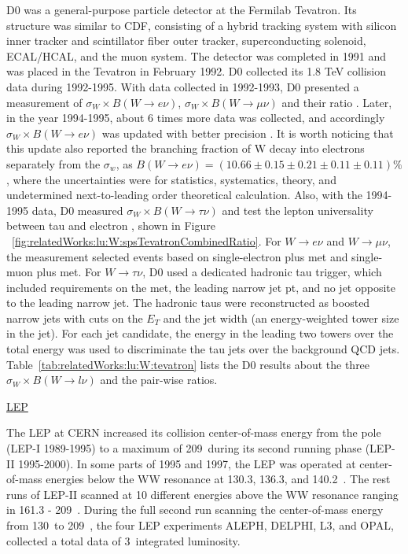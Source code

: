 D0 was a general-purpose particle detector at the Fermilab Tevatron. Its structure was similar to CDF, consisting of a hybrid tracking system with silicon inner tracker and scintillator fiber outer tracker, superconducting solenoid, ECAL/HCAL, and the muon system. The detector was completed in 1991 and was placed in the Tevatron in February 1992. D0 collected its 1.8 TeV collision data during 1992-1995. With data collected in 1992-1993, D0 presented a measurement of $\sigma_W \times B(W\to e\nu)$, $\sigma_W \times B(W\to \mu \nu)$ and their ratio \cite{Abachi:1995xc}. Later, in the year 1994-1995, about 6 times more data was collected, and accordingly $\sigma_W \times B(W\to e\nu)$ was updated with better precision \cite{Abbott:1999tt}. It is worth noticing that this update \cite{Abbott:1999tt} also reported the branching fraction of W decay into electrons separately from the $\sigma_w$, as $B(W\to e\nu)=(10.66\pm0.15\pm0.21\pm0.11\pm0.11)\%$, where the uncertainties were for statistics, systematics, theory, and undetermined next-to-leading order theoretical calculation. Also, with the 1994-1995 data, D0 measured $\sigma_W \times B(W\to \tau \nu)$ and test the lepton universality between tau and electron \cite{Abbott:1999pk}, shown in Figure ~\ref{fig:relatedWorks:lu:W:spsTevatronCombinedRatio}. For $W \to e \nu$ and $W \to \mu \nu$, the measurement selected events based on single-electron plus met and single-muon plus met. For $W \to \tau \nu$, D0 used a dedicated hadronic tau trigger, which included requirements on the met, the leading narrow jet pt, and no jet opposite to the leading narrow jet. The hadronic taus were reconstructed as boosted narrow jets with cuts on the $E_T$ and the jet width (an energy-weighted tower size in the jet). For each jet candidate, the energy in the leading two towers over the total energy was used to discriminate the tau jets over the background QCD jets. Table~\ref{tab:relatedWorks:lu:W:tevatron} lists the D0 results about the three $\sigma_W \times B(W\to l \nu)$ and the pair-wise ratios. 






\underline{LEP}

The LEP at CERN increased its collision center-of-mass energy from the \PZ pole (LEP-I 1989-1995) to a maximum of 209~\GeV during its second running phase (LEP-II 1995-2000). In some parts of 1995 and 1997, the LEP was operated at center-of-mass energies below the WW resonance at 130.3, 136.3, and 140.2~\GeV. The rest runs of LEP-II scanned at 10 different energies above the WW resonance ranging in 161.3 - 209~\GeV. During the full second run scanning the center-of-mass energy from 130~\GeV to 209~\GeV, the four LEP experiments ALEPH, DELPHI, L3, and OPAL, collected a total data of 3~\fbinv integrated luminosity. 

